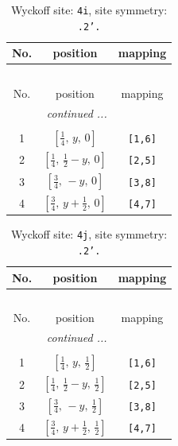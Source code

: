 \documentclass[fleqn,8pt]{jsarticle}
\begin{document}
\renewcommand{\arraystretch}{1.2}
\begin{longtable}{ccc}
\caption{Wyckoff site: {\tt 4i}, site symmetry: {\tt .2'.}}
 \\
 \hline \hline
No. & position & mapping \\ \hline \endfirsthead

\multicolumn{2}{l}{\tablename\ \thetable{}} \\
 \hline \hline
No. & position & mapping \\ \hline \endhead

 \hline \hline
\multicolumn{2}{r}{\footnotesize\it continued ...} \\ \endfoot

 \hline \hline
\multicolumn{2}{r}{} \\ \endlastfoot

1 & $\left[ \frac{1}{4},\, y,\, 0 \right]$ & {\tt [1,6]} \\ \hline
2 & $\left[ \frac{1}{4},\, \frac{1}{2} - y,\, 0 \right]$ & {\tt [2,5]} \\ \hline
3 & $\left[ \frac{3}{4},\, - y,\, 0 \right]$ & {\tt [3,8]} \\ \hline
4 & $\left[ \frac{3}{4},\, y + \frac{1}{2},\, 0 \right]$ & {\tt [4,7]} \\
\end{longtable}
\renewcommand{\arraystretch}{1.2}
\begin{longtable}{ccc}
\caption{Wyckoff site: {\tt 4j}, site symmetry: {\tt .2'.}}
 \\
 \hline \hline
No. & position & mapping \\ \hline \endfirsthead

\multicolumn{2}{l}{\tablename\ \thetable{}} \\
 \hline \hline
No. & position & mapping \\ \hline \endhead

 \hline \hline
\multicolumn{2}{r}{\footnotesize\it continued ...} \\ \endfoot

 \hline \hline
\multicolumn{2}{r}{} \\ \endlastfoot

1 & $\left[ \frac{1}{4},\, y,\, \frac{1}{2} \right]$ & {\tt [1,6]} \\ \hline
2 & $\left[ \frac{1}{4},\, \frac{1}{2} - y,\, \frac{1}{2} \right]$ & {\tt [2,5]} \\ \hline
3 & $\left[ \frac{3}{4},\, - y,\, \frac{1}{2} \right]$ & {\tt [3,8]} \\ \hline
4 & $\left[ \frac{3}{4},\, y + \frac{1}{2},\, \frac{1}{2} \right]$ & {\tt [4,7]} \\
\end{longtable}
\end{document}
